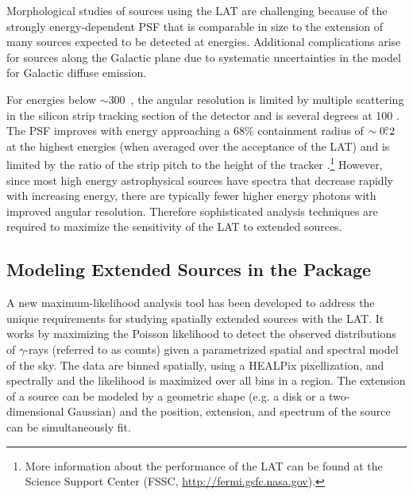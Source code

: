 Morphological studies of sources using the LAT are challenging
because of the strongly energy-dependent PSF that is comparable in
size to the extension of many sources expected to be detected at
\gev energies.  Additional complications arise for sources along
the Galactic plane due to systematic uncertainties in the model for
Galactic diffuse emission.  

For energies below $\sim$300~\mev, the angular resolution is limited by
multiple scattering in the silicon strip tracking section
of the detector and is several degrees at 100 \mev.  The PSF improves
with energy approaching a 68\% containment radius of $\sim0\mbox{$.\!\!^\circ$}2$ at
the highest energies (when averaged over the acceptance of the LAT)
and is limited by the ratio of the strip pitch to the height of the tracker
\citep{atwood_2009a_large-telescope,abdo_2009a_on-orbit-calibration,ackermann_2012a_fermi-large}.\footnote{More
information about the performance of the LAT can be found at the \fermi
Science Support Center (FSSC, \url{http://fermi.gsfc.nasa.gov}).} However,
since most high energy astrophysical sources have spectra that decrease
rapidly with increasing energy, there are typically fewer higher
energy photons with improved angular resolution. Therefore sophisticated
analysis techniques are required to maximize the sensitivity of the LAT
to extended sources.

\subsection{Modeling Extended Sources in the \pointlike Package}

A new maximum-likelihood analysis tool has been developed to address the
unique requirements for studying spatially extended sources with the LAT.
It works by maximizing the Poisson 
likelihood to detect the observed distributions of $\gamma$-rays (referred to as counts)
given a parametrized spatial and spectral model of the sky.  
The data are binned spatially, using a HEALPix pixellization, and spectrally 
\citep{gorski_2005_healpix:-framework} and the likelihood is maximized over all bins in
a region.
The extension of a source can be modeled by a geometric shape
(e.g. a disk or a two-dimensional Gaussian) and the position, extension,
and spectrum of the source can be simultaneously fit.

